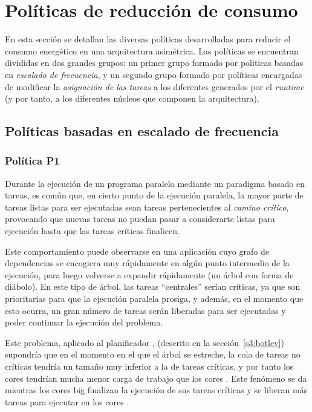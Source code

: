 \section{Políticas de reducción de consumo}
En esta sección se detallan las diversas políticas desarrolladas para 
reducir el consumo energético en una arquitectura asimétrica. Las políticas
se encuentran divididas en dos grandes grupos: un primer grupo formado por
politicas basadas en {\em escalado de frecuencia}, y un segundo grupo formado por
políticas encargadas de modificar la {\em asignación de las tareas} a los
diferentes \wts generados por el \emph{runtime} (y por tanto, a los diferentes núcleos que
componen la arquitectura).

\subsection[{Políticas basadas en escalado de frecuencia (P1, P2, P2' y P3)}]{Políticas basadas en escalado de frecuencia}


\subsubsection{Política P1}

Durante la ejecución de un programa paralelo mediante un paradigma basado
en tareas, es común que, en cierto punto de la ejecución paralela,
la mayor parte de tareas listas para ser ejecutadas
sean tareas pertenecientes al {\em camino crítico}, provocando que nuevas tareas no puedan 
pasar a considerarte listas para ejecución hasta que las tareas críticas finalicen. 

Este comportamiento puede observarse en una aplicación cuyo grafo de
dependencias se encogiera muy rápidamente en algún punto intermedio de la
ejecución, para luego volverse a expandir rápidamente (un árbol con forma
de diábolo). En este tipo de árbol, las tareas ``centrales''
serían críticas, ya que son prioritarias para que la ejecución paralela
prosiga, y además, en el momento que esto ocurra, un gran
número de tareas serán liberadas para ser ejecutadas y
poder continuar la ejecución del problema.

Este problema, aplicado al planificador \botlev, (descrito en la
sección~\ref{s3:botlev}) supondría que en el momento en el que el árbol se
estreche, la cola de tareas no críticas tendría un tamaño muy inferior a la
de tareas críticas, y por tanto los cores \LITTLE tendrían mucha menor carga
de trabajo que los cores \BIG. Este fenómeno se da mientras los cores big
finalizan la ejecución de sus tareas críticas y se liberan más tareas para
ejecutar en los cores \LITTLE.

